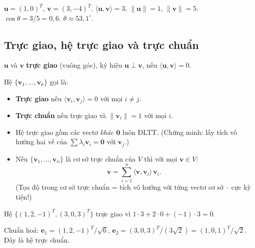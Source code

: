 \documentclass[12pt,a4paper]{article}
\begin{document}
\begin{vidu}
$\mathbf{u} = (1, 0)^T$, $\mathbf{v} = (3, -4)^T$. $\langle \mathbf{u}, \mathbf{v}\rangle = 3$, $\|\mathbf{u}\| = 1$, $\|\mathbf{v}\| = 5$. $\cos\theta = 3/5 = 0{,}6$. $\theta \approx 53{,}1^\circ$.
\end{vidu}

\subsection{Trực giao, hệ trực giao và trực chuẩn}

\begin{dinhnghia}
  $\mathbf{u}$ và $\mathbf{v}$ \textbf{trực giao} (vuông góc), ký hiệu $\mathbf{u} \perp \mathbf{v}$, nếu $\langle \mathbf{u}, \mathbf{v}\rangle = 0$.

  Hệ $\{\mathbf{v}_1, \ldots, \mathbf{v}_k\}$ gọi là:
  \begin{itemize}
    \item \textbf{Trực giao} nếu $\langle \mathbf{v}_i, \mathbf{v}_j\rangle = 0$ với mọi $i \ne j$.
    \item \textbf{Trực chuẩn} nếu trực giao và $\|\mathbf{v}_i\| = 1$ với mọi $i$.
  \end{itemize}
\end{dinhnghia}

\begin{tinhchat}
\begin{itemize}
  \item Hệ trực giao gồm các vectơ \emph{khác $\mathbf{0}$} luôn ĐLTT. (Chứng minh: lấy tích vô hướng hai vế của $\sum \lambda_i \mathbf{v}_i = \mathbf{0}$ với $\mathbf{v}_j$.)
  \item Nếu $\{\mathbf{v}_1, \ldots, \mathbf{v}_n\}$ là cơ sở trực chuẩn của $V$ thì với mọi $\mathbf{v} \in V$:
  \[
    \mathbf{v} = \sum_{i=1}^n \langle \mathbf{v}, \mathbf{v}_i\rangle\, \mathbf{v}_i.
  \]
  (Tọa độ trong cơ sở trực chuẩn = tích vô hướng với từng vectơ cơ sở -- cực kỳ tiện!)
\end{itemize}
\end{tinhchat}

\begin{vidu}
Hệ $\{(1, 2, -1)^T, (3, 0, 3)^T\}$ trực giao vì $1\cdot 3 + 2\cdot 0 + (-1)\cdot 3 = 0$.

Chuẩn hoá: $\mathbf{e}_1 = (1, 2, -1)^T/\sqrt{6}$, $\mathbf{e}_2 = (3, 0, 3)^T/(3\sqrt{2}) = (1, 0, 1)^T/\sqrt{2}$. Đây là hệ trực chuẩn.
\end{vidu}
\end{document}
